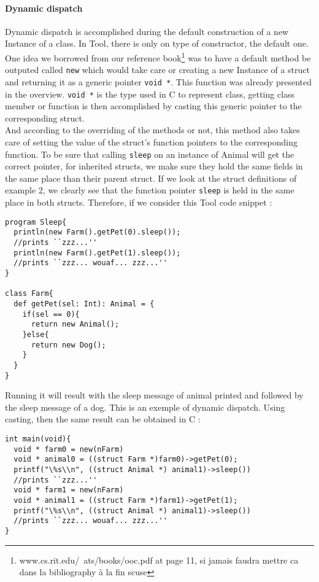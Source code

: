 \paragraph{Dynamic dispatch}
Dynamic dispatch is accomplished during the default construction of a new Instance of a class.
In Tool, there is only on type of constructor, the default one.
One idea we borrowed from our reference book\footnote{www.cs.rit.edu/~ats/books/ooc.pdf at page 11, si jamais faudra mettre ca dans la bibliography à la fin scuse} was to have a default method be outputed called {\lstinline[basicstyle=\small\ttfamily]|new|} which would take care or creating a new Instance of a struct and returning it as a generic pointer {\lstinline[basicstyle=\small\ttfamily]|void *|}. This function was already presented in the overview. {\lstinline[basicstyle=\small\ttfamily]|void *|} is the type used in C to represent class, getting class member or function is then accomplished by casting this generic pointer to the corresponding struct.\\

And according to the overriding of the methods or not, this method also takes care of setting the value of the struct's function pointers to the corresponding function. To be sure that calling {\lstinline[basicstyle=\small\ttfamily]|sleep|} on an instance of Animal will get the correct pointer, for inherited structs, we make sure they hold the same fields in the same place than their parent struct. If we look at the struct definitions of example 2, we clearly see that the function pointer {\lstinline[basicstyle=\small\ttfamily]|sleep|} is held in the same place in both structs. Therefore, if we consider this Tool code snippet :

\lstset{style=customtool}
\begin{lstlisting}
program Sleep{
  println(new Farm().getPet(0).sleep());
  //prints ``zzz...''
  println(new Farm().getPet(1).sleep());
  //prints ``zzz... wouaf... zzz...''
}

class Farm{
  def getPet(sel: Int): Animal = {
    if(sel == 0){
      return new Animal();
    }else{
      return new Dog();
    }
  }
}
\end{lstlisting}
Running it will result with the sleep message of animal printed and followed by the sleep message of a dog. This is an exemple of dynamic dispatch. Using casting, then the same result can be obtained in C :

\lstset{style=customc}
\begin{lstlisting}
int main(void){
  void * farm0 = new(nFarm)
  void * animal0 = ((struct Farm *)farm0)->getPet(0);
  printf("\%s\\n", ((struct Animal *) animal1)->sleep())
  //prints ``zzz...''
  void * farm1 = new(nFarm)
  void * animal1 = ((struct Farm *)farm1)->getPet(1);
  printf("\%s\\n", ((struct Animal *) animal1)->sleep())
  //prints ``zzz... wouaf... zzz...''
}
\end{lstlisting}

